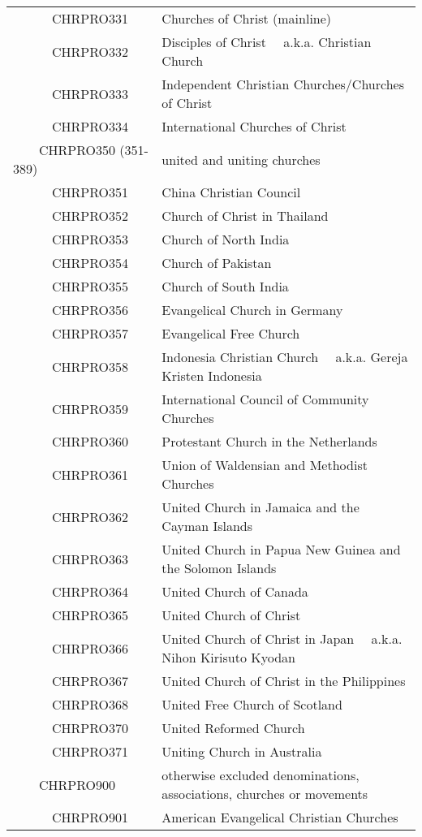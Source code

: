 \documentclass[12pt]{article}
\begin{document}
\begin{tiny}
\begin{center}
\begin{longtable}{|l|l|}
~~~~~~CHRPRO331 & Churches of Christ (mainline) \\
~~~~~~CHRPRO332 & Disciples of Christ	~~a.k.a. Christian Church \\
~~~~~~CHRPRO333 & Independent Christian Churches/Churches of Christ \\
~~~~~~CHRPRO334 & International Churches of Christ \\
~~~~CHRPRO350 (351-389) & united and uniting churches \\
~~~~~~CHRPRO351 & China Christian Council \\
~~~~~~CHRPRO352 & Church of Christ in Thailand \\
~~~~~~CHRPRO353 & Church of North India \\
~~~~~~CHRPRO354 & Church of Pakistan \\
~~~~~~CHRPRO355 & Church of South India \\
~~~~~~CHRPRO356 & Evangelical Church in Germany \\
~~~~~~CHRPRO357 & Evangelical Free Church \\
~~~~~~CHRPRO358 & Indonesia Christian Church	~~a.k.a. Gereja Kristen Indonesia \\
~~~~~~CHRPRO359 & International Council of Community Churches \\
~~~~~~CHRPRO360 & Protestant Church in the Netherlands \\
~~~~~~CHRPRO361 & Union of Waldensian and Methodist Churches \\
~~~~~~CHRPRO362 & United Church in Jamaica and the Cayman Islands \\
~~~~~~CHRPRO363 & United Church in Papua New Guinea and the Solomon Islands \\
~~~~~~CHRPRO364 & United Church of Canada \\
~~~~~~CHRPRO365 & United Church of Christ \\
~~~~~~CHRPRO366 & United Church of Christ in Japan	~~a.k.a. Nihon Kirisuto Kyodan \\
~~~~~~CHRPRO367 & United Church of Christ in the Philippines \\
~~~~~~CHRPRO368 & United Free Church of Scotland \\
~~~~~~CHRPRO370 & United Reformed Church \\
~~~~~~CHRPRO371 & Uniting Church in Australia \\
~~~~CHRPRO900 & otherwise excluded denominations, associations, churches or movements \\
~~~~~~CHRPRO901 & American Evangelical Christian Churches \\

\end{longtable}
\end{center}
\end{tiny}
\end{document}
